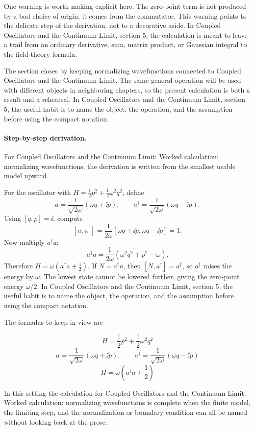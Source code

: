 One warning is worth making explicit here.  The zero-point term is not produced by a bad choice of origin; it comes from the commutator.  This warning points to the delicate step of the derivation, not to a decorative aside.  In Coupled Oscillators and the Continuum Limit, section 5, the calculation is meant to leave a trail from an ordinary derivative, sum, matrix product, or Gaussian integral to the field-theory formula.

The section closes by keeping normalizing wavefunctions connected to Coupled Oscillators and the Continuum Limit.  The same general operation will be used with different objects in neighboring chapters, so the present calculation is both a result and a rehearsal.  In Coupled Oscillators and the Continuum Limit, section 5, the useful habit is to name the object, the operation, and the assumption before using the compact notation.



\paragraph{Step-by-step derivation.}

For Coupled Oscillators and the Continuum Limit: Worked calculation: normalizing wavefunctions, the derivation is written from the smallest usable model upward.

For the oscillator with \(H=\frac12p^2+\frac12\omega^2q^2\), define
\[
  a=\frac{1}{\sqrt{2\omega}}(\omega q+\ii p),\qquad
  a^\dagger=\frac{1}{\sqrt{2\omega}}(\omega q-\ii p).
\]
Using \([q,p]=\ii\), compute
\[
  [a,a^\dagger]
  =
  \frac{1}{2\omega}[\omega q+\ii p,\omega q-\ii p]=1.
\]
Now multiply \(a^\dagger a\):
\[
  a^\dagger a=\frac{1}{2\omega}(\omega^2q^2+p^2-\omega).
\]
Therefore \(H=\omega(a^\dagger a+\frac12)\).  If \(N=a^\dagger a\), then \([N,a^\dagger]=a^\dagger\), so \(a^\dagger\) raises the energy by \(\omega\).  The lowest state cannot be lowered further, giving the zero-point energy \(\omega/2\).  In Coupled Oscillators and the Continuum Limit, section 5, the useful habit is to name the object, the operation, and the assumption before using the compact notation.

The formulas to keep in view are

\[
  H=\frac12p^2+\frac12\omega^2q^2
\]
\[
  a=\frac{1}{\sqrt{2\omega}}(\omega q+\ii p),\qquad a^\dagger=\frac{1}{\sqrt{2\omega}}(\omega q-\ii p)
\]
\[
  H=\omega\left(a^\dagger a+\frac12\right)
\]

In this setting the calculation for Coupled Oscillators and the Continuum Limit: Worked calculation: normalizing wavefunctions is complete when the finite model, the limiting step, and the normalization or boundary condition can all be named without looking back at the prose.




